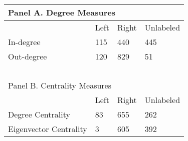 %
    
    \centering
    \begin{tabular}{llll}
    \toprule\toprule
    \multicolumn{3}{l}{Panel A. Degree Measures} \\ 
        \midrule
        ~ & Left & Right & Unlabeled \\ \midrule
        In-degree & 115 & 440 & 445 \\ 
        Out-degree & 120 & 829 & 51 \\ 
        ~ & ~ & ~ & ~ \\ \midrule
        
        \multicolumn{3}{l}{Panel B. Centrality Measures} \\
         \midrule   
        ~ & Left & Right & Unlabeled \\ \midrule
        Degree Centrality & 83 & 655 & 262 \\ 
        Eigenvector Centrality & 3 & 605 & 392 \\ 
        \bottomrule\bottomrule
    \end{tabular}
    
%